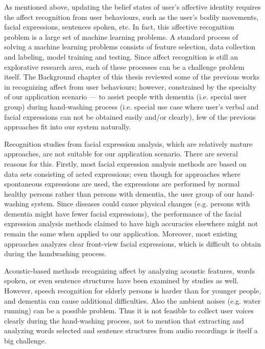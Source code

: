 As mentioned above, updating the belief states of user's affective identity requires the affect recognition from user behaviours, such as the user's bodily movements, facial expressions, sentences spoken, etc. In fact, this affective recognition problem is a large set of machine learning problems. A standard process of solving a machine learning problems consists of feature selection, data collection and labeling, model training and testing. Since affect recognition is still an explorative research area, each of these processes can be a challenge problem itself. The Background chapter of this thesis reviewed some of the previous works in recognizing affect from user behaviours; however, constrained by the specialty of our application scenario --- to assist people with dementia (i.e. special user group) during hand-washing process (i.e. special use case where user's verbal and facial expressions can not be obtained easily and/or clearly), few of the previous approaches fit into our system naturally.

Recognition studies from facial expression analysis, which are relatively mature approaches, are not suitable for our application scenario. There are several reasons for this. Firstly, most facial expression analysis methods are based on data sets consisting of acted expressions; even though for approaches where spontaneous expressions are used, the expressions are performed by normal healthy persons rather than persons with dementia, the user group of our hand-washing system. Since diseases could cause physical changes (e.g. persons with dementia might have fewer facial expressions), the performance of the facial expression analysis methods claimed to have high accuracies elsewhere might not remain the same when applied to our application. Moreover, most existing approaches analyzes clear front-view facial expressions, which is difficult to obtain during the handwashing process. 

Acoustic-based methods recognizing affect by analyzing acoustic features, words spoken, or even sentence structures have been examined by studies as well. However, speech recognition for elderly persons is harder than for younger people, and dementia can cause additional difficulties. Also the ambient noises (e.g. water running) can be a possible problem. Thus it is not feasible to collect user voices clearly during the hand-washing process, not to mention that extracting and analyzing words selected and sentence structures from audio recordings is itself a big challenge. 

